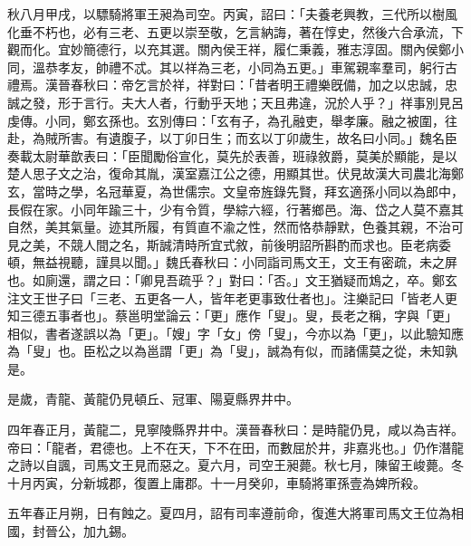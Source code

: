 \begin{pinyinscope}
秋八月甲戌，以驃騎將軍王昶為司空。丙寅，詔曰：「夫養老興教，三代所以樹風化垂不朽也，必有三老、五更以崇至敬，乞言納誨，著在惇史，然後六合承流，下觀而化。宜妙簡德行，以充其選。關內侯王祥，履仁秉義，雅志淳固。關內侯鄭小同，溫恭孝友，帥禮不忒。其以祥為三老，小同為五更。」車駕親率羣司，躬行古禮焉。漢晉春秋曰：帝乞言於祥，祥對曰：「昔者明王禮樂旣備，加之以忠誠，忠誠之發，形于言行。夫大人者，行動乎天地；天且弗違，況於人乎？」祥事別見呂虔傳。小同，鄭玄孫也。玄別傳曰：「玄有子，為孔融吏，舉孝廉。融之被圍，往赴，為賊所害。有遺腹子，以丁卯日生；而玄以丁卯歲生，故名曰小同。」魏名臣奏載太尉華歆表曰：「臣聞勵俗宣化，莫先於表善，班祿敘爵，莫美於顯能，是以楚人思子文之治，復命其胤，漢室嘉江公之德，用顯其世。伏見故漢大司農北海鄭玄，當時之學，名冠華夏，為世儒宗。文皇帝旌錄先賢，拜玄適孫小同以為郎中，長假在家。小同年踰三十，少有令質，學綜六經，行著鄉邑。海、岱之人莫不嘉其自然，美其氣量。迹其所履，有質直不渝之性，然而恪恭靜默，色養其親，不治可見之美，不競人間之名，斯誠清時所宜式敘，前後明詔所斟酌而求也。臣老病委頓，無益視聽，謹具以聞。」魏氏春秋曰：小同詣司馬文王，文王有密疏，未之屏也。如廁還，謂之曰：「卿見吾疏乎？」對曰：「否。」文王猶疑而鴆之，卒。鄭玄注文王世子曰「三老、五更各一人，皆年老更事致仕者也」。注樂記曰「皆老人更知三德五事者也」。蔡邕明堂論云：「更」應作「叟」。叟，長老之稱，字與「更」相似，書者遂誤以為「更」。「嫂」字「女」傍「叟」，今亦以為「更」，以此驗知應為「叟」也。臣松之以為邕謂「更」為「叟」，誠為有似，而諸儒莫之從，未知孰是。

是歲，青龍、黃龍仍見頓丘、冠軍、陽夏縣界井中。

四年春正月，黃龍二，見寧陵縣界井中。漢晉春秋曰：是時龍仍見，咸以為吉祥。帝曰：「龍者，君德也。上不在天，下不在田，而數屈於井，非嘉兆也。」仍作潛龍之詩以自諷，司馬文王見而惡之。夏六月，司空王昶薨。秋七月，陳留王峻薨。冬十月丙寅，分新城郡，復置上庸郡。十一月癸卯，車騎將軍孫壹為婢所殺。

五年春正月朔，日有蝕之。夏四月，詔有司率遵前命，復進大將軍司馬文王位為相國，封晉公，加九錫。


\end{pinyinscope}
